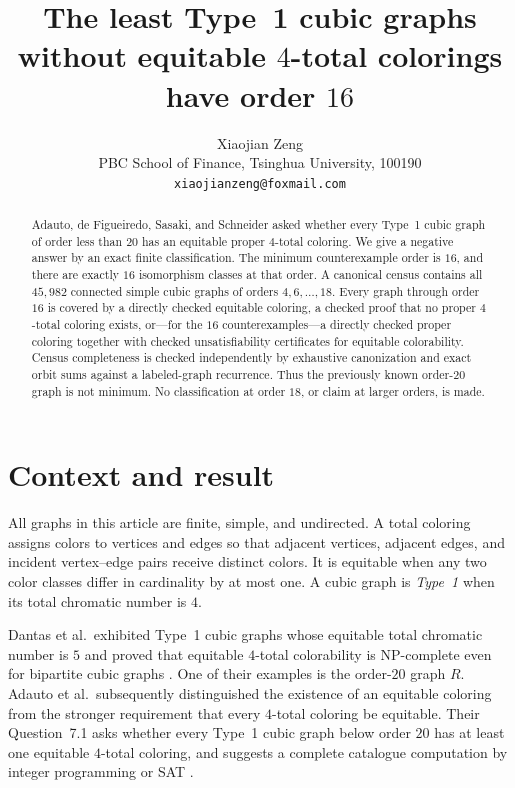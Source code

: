 \documentclass[11pt]{article}
\title{The least Type~1 cubic graphs without equitable
  \(4\)-total colorings have order \(16\)}
\author{Xiaojian Zeng\\
PBC School of Finance, Tsinghua University, 100190\\
\texttt{xiaojianzeng@foxmail.com}}
\date{}
\begin{document}
\maketitle

\begin{abstract}
Adauto, de Figueiredo, Sasaki, and Schneider asked whether every Type~1
cubic graph of order less than \(20\) has an equitable proper
\(4\)-total coloring.  We give a negative answer by an exact finite
classification.  The minimum counterexample order is \(16\), and there
are exactly \(16\) isomorphism classes at that order.  A canonical census
contains all \(45{,}982\) connected simple cubic graphs of orders
\(4,6,\ldots,18\).  Every graph through order \(16\) is covered by a
directly checked equitable coloring, a checked proof that no proper
\(4\)-total coloring exists, or---for the \(16\) counterexamples---a
directly checked proper coloring together with checked unsatisfiability
certificates for equitable colorability.  Census completeness is checked
independently by exhaustive canonization and exact orbit sums against a
labeled-graph recurrence.  Thus the previously known order-\(20\) graph
is not minimum.  No classification at order \(18\), or claim at larger
orders, is made.
\end{abstract}

\section{Context and result}

All graphs in this article are finite, simple, and undirected.  A total
coloring assigns colors to vertices and edges so that adjacent vertices,
adjacent edges, and incident vertex--edge pairs receive distinct colors.
It is equitable when any two color classes differ in cardinality by at
most one.  A cubic graph is \emph{Type~1} when its total chromatic number
is \(4\).

Dantas et al.\ exhibited Type~1 cubic graphs whose equitable total
chromatic number is \(5\) and proved that equitable \(4\)-total
colorability is NP-complete even for bipartite cubic graphs
\cite{DantasEtAl2016}.  One of their examples is the order-\(20\) graph
\(R\).  Adauto et al.\ subsequently distinguished the existence of an
equitable coloring from the stronger requirement that every
\(4\)-total coloring be equitable.  Their Question~7.1 asks whether every
Type~1 cubic graph below order \(20\) has at least one equitable
\(4\)-total coloring, and suggests a complete catalogue computation by
integer programming or SAT \cite{AdautoEtAl2026}.
\end{document}
